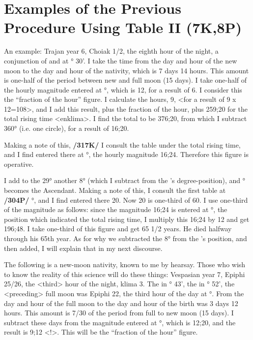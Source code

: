 \section{Examples of the Previous Procedure Using Table II (7K,8P)}

An example: Trajan year 6, Choiak 1/2, the eighth hour of the night, a conjunction of \Sun\xspace and \Moon\xspace at \Sagittarius\xspace 8° 30'. I take the time from the day and hour of the new moon to the day and hour of the nativity, which is 7 days 14 hours. This amount is one-half of the period between new and full moon (15 days). I take one-half of the hourly magnitude entered at \Sagittarius\xspace 8°, which is 12, for a result of 6. I consider this the “fraction of the hour” figure. I calculate the hours, 9, <for a result of 9 x 12=108>, and I
add this result, plus the fraction of the hour, plus 259;20 for the total rising time <enklima>. I find the total to be 376;20, from which I subtract 360° (i.e. one circle), for a result of 16;20. 

Making a note of this, \textbf{/317K/} I consult the table under the total rising time, and I find entered there at \Aries\xspace 29°, the hourly magnitude 16;24. Therefore this figure is operative. 

I add to the 29° another 8° (which I subtract from the \Sun’s degree-position), and \Taurus\xspace 7° becomes the Ascendant. Making a note of this, I consult the first table at \textbf{/304P/} \Taurus\xspace 7°, and I find entered there 20. Now 20 is one-third of 60. I use one-third of the magnitude as follows: since the magnitude 16;24 is entered at \Aries\xspace 29°, the position which indicated the total rising time, I multiply this 16;24 by 12 and get 196;48. I take one-third of this figure and get 65 1/2 years. He died halfway through his 65th year. As for why we subtracted the 8° from the \Sun’s position, and then added, I will explain that in my next discourse.

The following is a new-moon nativity, known to me by hearsay. Those who wish to know the reality of this science will do these things: Vespasian year 7, Epiphi 25/26, the <third> hour of the night, klima 3. The \Sun\xspace in \Cancer\xspace 27° 43', the \Moon\xspace in \Pisces\xspace 12° 52', the <preceding> full moon was Epiphi 22, the third hour of the day at \Capricorn\xspace 24°. From the day and hour of the full moon to the day and hour of the birth was 3 days 12 hours. This amount is 7/30 of the period from full to new moon (15 days). I subtract these days from the magnitude entered at \Capricorn\xspace 20°, which is 12;20, and the result is 9;12 <!>. This will be the “fraction of the hour” figure. 

